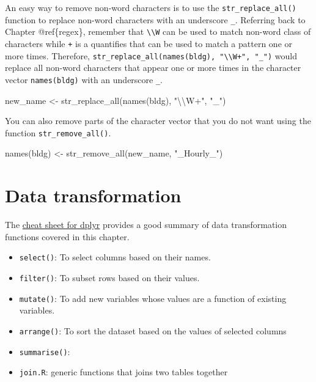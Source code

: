 \documentclass[
]{book}
\newenvironment{Shaded}{\begin{snugshade}}{\end{snugshade}}
\newcommand{\FunctionTok}[1]{\textcolor[rgb]{0.00,0.00,0.00}{#1}}
\newcommand{\NormalTok}[1]{#1}
\newcommand{\OtherTok}[1]{\textcolor[rgb]{0.56,0.35,0.01}{#1}}
\newcommand{\SpecialCharTok}[1]{\textcolor[rgb]{0.00,0.00,0.00}{#1}}
\newcommand{\StringTok}[1]{\textcolor[rgb]{0.31,0.60,0.02}{#1}}
\providecommand{\tightlist}{%
  \setlength{\itemsep}{0pt}\setlength{\parskip}{0pt}}
\begin{document}
An easy way to remove non-word characters is to use the \texttt{str\_replace\_all()} function to replace non-word characters with an underscore \texttt{\_}. Referring back to Chapter @ref\{regex\}, remember that \texttt{\textbackslash{}\textbackslash{}W} can be used to match non-word class of characters while \texttt{+} is a quantifies that can be used to match a pattern one or more times. Therefore, \texttt{str\_replace\_all(names(bldg),\ "\textbackslash{}\textbackslash{}W+",\ "\_")} would replace all non-word characters that appear one or more times in the character vector \texttt{names(bldg)} with an underscore \texttt{\_}.

\begin{Shaded}
\begin{Highlighting}[]
\NormalTok{new\_name }\OtherTok{\textless{}{-}} \FunctionTok{str\_replace\_all}\NormalTok{(}\FunctionTok{names}\NormalTok{(bldg), }\StringTok{"}\SpecialCharTok{\textbackslash{}\textbackslash{}}\StringTok{W+"}\NormalTok{, }\StringTok{"\_"}\NormalTok{)}
\end{Highlighting}
\end{Shaded}

You can also remove parts of the character vector that you do not want using the function \texttt{str\_remove\_all()}.

\begin{Shaded}
\begin{Highlighting}[]
\FunctionTok{names}\NormalTok{(bldg) }\OtherTok{\textless{}{-}} \FunctionTok{str\_remove\_all}\NormalTok{(new\_name, }\StringTok{"\_Hourly\_"}\NormalTok{)}
\end{Highlighting}
\end{Shaded}

\hypertarget{data-transformation}{%
\section{Data transformation}\label{data-transformation}}

The \href{https://github.com/rstudio/cheatsheets/blob/master/data-transformation.pdf}{cheat sheet for dplyr} provides a good summary of data transformation functions covered in this chapter.

\begin{itemize}
\tightlist
\item
  \texttt{select()}: To select columns based on their names.
\item
  \texttt{filter()}: To subset rows based on their values.
\item
  \texttt{mutate()}: To add new variables whose values are a function of existing variables.
\item
  \texttt{arrange()}: To sort the dataset based on the values of selected columns
\item
  \texttt{summarise()}:
\item
  \texttt{join.R}: generic functions that joins two tables together
\end{itemize}
\end{document}
